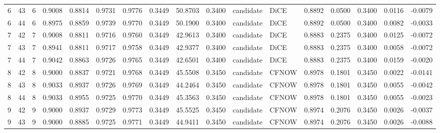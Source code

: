 \begin{tabular}{rrrrrrrrrrllrrrrr}
  6 &    43 &            6 &  0.9008 &   0.8814 &     0.9731 &      0.9776 &           0.3449 &      50.8703 &  0.3400 & candidate &   DiCE &          0.8892 &               0.0500 &                     0.3400 &   0.0116 &   -0.0079 \\
  6 &    44 &            6 &  0.8975 &   0.8859 &     0.9739 &      0.9770 &           0.3449 &      50.1900 &  0.3400 & candidate &   DiCE &          0.8892 &               0.0500 &                     0.3400 &   0.0082 &   -0.0033 \\
  7 &    42 &            7 &  0.9008 &   0.8811 &     0.9716 &      0.9760 &           0.3449 &      42.9613 &  0.3400 & candidate &   DiCE &          0.8883 &               0.2375 &                     0.3400 &   0.0125 &   -0.0072 \\
  7 &    43 &            7 &  0.8941 &   0.8811 &     0.9717 &      0.9758 &           0.3449 &      42.9377 &  0.3400 & candidate &   DiCE &          0.8883 &               0.2375 &                     0.3400 &   0.0058 &   -0.0072 \\
  7 &    44 &            7 &  0.9042 &   0.8863 &     0.9726 &      0.9765 &           0.3449 &      42.6501 &  0.3400 & candidate &   DiCE &          0.8883 &               0.2375 &                     0.3400 &   0.0159 &   -0.0020 \\
  8 &    42 &            8 &  0.9000 &   0.8837 &     0.9721 &      0.9768 &           0.3449 &      45.5508 &  0.3450 & candidate &  CFNOW &          0.8978 &               0.1801 &                     0.3450 &   0.0022 &   -0.0141 \\
  8 &    43 &            8 &  0.9033 &   0.8937 &     0.9726 &      0.9769 &           0.3449 &      44.2464 &  0.3450 & candidate &  CFNOW &          0.8978 &               0.1801 &                     0.3450 &   0.0055 &   -0.0042 \\
  8 &    44 &            8 &  0.9033 &   0.8955 &     0.9725 &      0.9770 &           0.3449 &      45.3563 &  0.3450 & candidate &  CFNOW &          0.8978 &               0.1801 &                     0.3450 &   0.0055 &   -0.0023 \\
  9 &    42 &            9 &  0.9000 &   0.8937 &     0.9729 &      0.9773 &           0.3449 &      45.5525 &  0.3450 & candidate &  CFNOW &          0.8974 &               0.2076 &                     0.3450 &   0.0026 &   -0.0037 \\
  9 &    43 &            9 &  0.9000 &   0.8885 &     0.9725 &      0.9771 &           0.3449 &      44.9411 &  0.3450 & candidate &  CFNOW &          0.8974 &               0.2076 &                     0.3450 &   0.0026 &   -0.0088 \\

\end{tabular}
